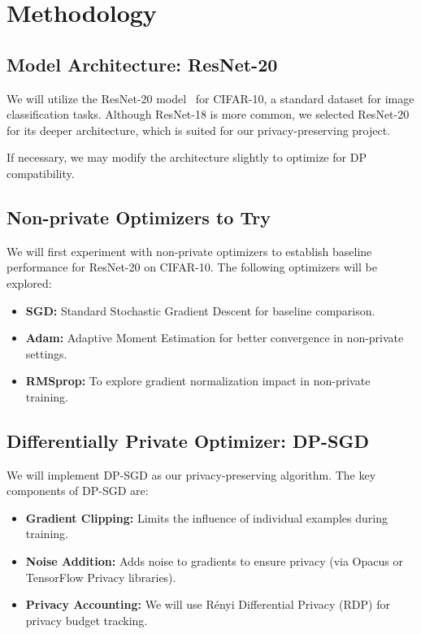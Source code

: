 \documentclass{article}
\begin{document}
    \section{Methodology}\label{sec:methodology}

    \subsection{Model Architecture: ResNet-20}\label{subsec:model-architecture:-resnet-20}

    We will utilize the ResNet-20 model~\citet{Idelbayev_ResNet20_CIFAR10} for CIFAR-10,
    a standard dataset for image classification tasks.
    Although ResNet-18 is more common, we selected ResNet-20 for its deeper architecture,
    which is suited for our privacy-preserving project.

    If necessary, we may modify the architecture slightly to optimize for DP compatibility.

    \subsection{Non-private Optimizers to Try}\label{subsec:non-private-optimizers-to-try}
    We will first experiment with non-private optimizers to establish baseline performance for ResNet-20 on CIFAR-10.
    The following optimizers will be explored:
    \begin{itemize}
        \item \textbf{SGD:} Standard Stochastic Gradient Descent for baseline comparison.
        \item \textbf{Adam:} Adaptive Moment Estimation for better convergence in non-private settings.
        \item \textbf{RMSprop:} To explore gradient normalization impact in non-private training.
    \end{itemize}

    \subsection{Differentially Private Optimizer: DP-SGD}\label{subsec:differentially-private-optimizer:-dp-sgd}
    We will implement DP-SGD as our privacy-preserving algorithm.
    The key components of DP-SGD are:
    \begin{itemize}
        \item \textbf{Gradient Clipping:} Limits the influence of individual examples during training.
        \item \textbf{Noise Addition:} Adds noise to gradients to ensure privacy (via Opacus or TensorFlow Privacy libraries).
        \item \textbf{Privacy Accounting:} We will use Rényi Differential Privacy (RDP) for privacy budget tracking.
    \end{itemize}
\end{document}
